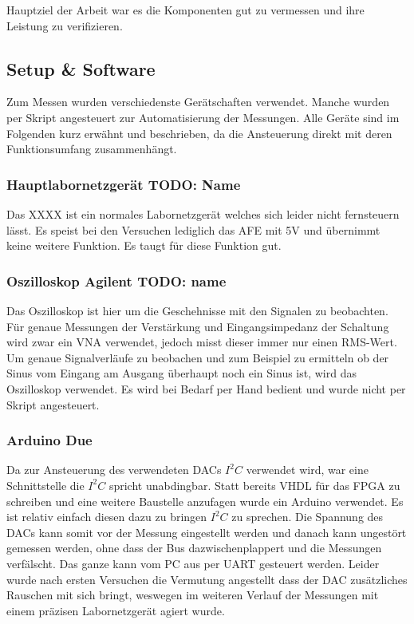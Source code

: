 
Hauptziel der Arbeit war es die Komponenten gut zu vermessen und ihre Leistung zu verifizieren.

\subsection{Setup \& Software}
Zum Messen wurden verschiedenste Gerätschaften verwendet. Manche wurden per Skript angesteuert zur Automatisierung der Messungen. Alle Geräte sind im Folgenden kurz erwähnt und beschrieben, da die Ansteuerung direkt mit deren Funktionsumfang zusammenhängt.

\subsubsection*{Hauptlabornetzgerät TODO: Name}
Das XXXX ist ein normales Labornetzgerät welches sich leider nicht fernsteuern lässt. Es speist bei den Versuchen lediglich das AFE mit 5V und übernimmt keine weitere Funktion. Es taugt für diese Funktion gut.

\subsubsection*{Oszilloskop Agilent TODO: name}
Das Oszilloskop ist hier um die Geschehnisse mit den Signalen zu beobachten. Für genaue Messungen der Verstärkung und Eingangsimpedanz der Schaltung wird zwar ein VNA verwendet, jedoch misst dieser immer nur einen RMS-Wert. Um genaue Signalverläufe zu beobachen und zum Beispiel zu ermitteln ob der Sinus vom Eingang am Ausgang überhaupt noch ein Sinus ist, wird das Oszilloskop verwendet. Es wird bei Bedarf per Hand bedient und wurde nicht per Skript angesteuert.

\subsubsection*{Arduino Due}
Da zur Ansteuerung des verwendeten DACs $I^2C$ verwendet wird, war eine Schnittstelle die $I^2C$ spricht unabdingbar. Statt bereits VHDL für das FPGA zu schreiben und eine weitere Baustelle anzufagen wurde ein Arduino verwendet. Es ist relativ einfach diesen dazu zu bringen $I^2C$ zu sprechen. Die Spannung des DACs kann somit vor der Messung eingestellt werden und danach kann ungestört gemessen werden, ohne dass der Bus dazwischenplappert und die Messungen verfälscht. Das ganze kann vom PC aus per UART gesteuert werden.
Leider wurde nach ersten Versuchen die Vermutung angestellt dass der DAC zusätzliches Rauschen mit sich bringt, weswegen im weiteren Verlauf der Messungen mit einem präzisen Labornetzgerät agiert wurde.


